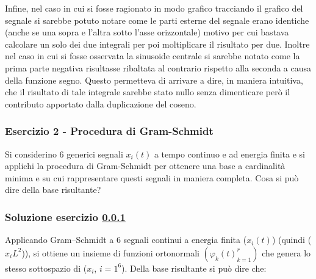 \documentclass[../main.tex]{subfiles}
\begin{document}
Infine, nel caso in cui si fosse ragionato in modo grafico tracciando il grafico del segnale si sarebbe potuto notare come le parti esterne del segnale erano identiche (anche se una sopra e l'altra sotto l'asse orizzontale) motivo per cui bastava calcolare un solo dei due integrali per poi moltiplicare il risultato per due.
Inoltre nel caso in cui si fosse osservata la sinusoide centrale si sarebbe notato come la prima parte negativa risultasse ribaltata al contrario rispetto alla seconda a causa della funzione segno. Questo permetteva di arrivare a dire, in maniera intuitiva, che il risultato di tale integrale sarebbe stato nullo senza dimenticare però il contributo apportato dalla duplicazione del coseno.

\vspace*{1.5cm}
\subsubsection{Esercizio 2 - Procedura di Gram-Schmidt}
\label{extra12}

Si considerino 6 generici segnali $x_i(t)$ a tempo continuo e ad energia finita e si applichi la procedura di Gram-Schmidt per ottenere una base a cardinalità minima e su cui rappresentare questi segnali in maniera completa. Cosa si può dire della base risultante?

\subsubsection*{Soluzione esercizio \ref{extra12}} 


Applicando Gram–Schmidt a 6 segnali continui a energia finita ($x_i(t)$) (quindi ($x_i  L^2$)), si ottiene un insieme di funzioni ortonormali $({\varphi_k(t)}_{k=1}^r)$ che genera lo stesso sottospazio di (${x_i}$, ${i=1}^6$). Della base risultante si può dire che:
\end{document}
